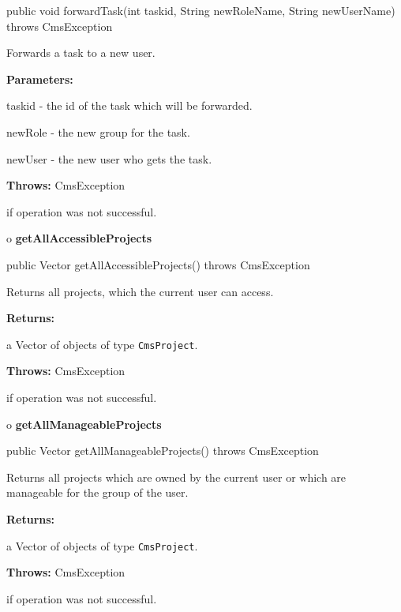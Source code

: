 \begin{PRE}
 public void forwardTask(int taskid,
                         String newRoleName,
                         String newUserName) throws CmsException
\end{PRE}

\begin{description}
\htmlDD Forwards a task to a new user.

\begin{description}
\item {\bf Parameters:}

taskid - the id of the task which will be forwarded.

newRole - the new group for the task.

newUser - the new user who gets the task.
\item {\bf Throws:} CmsException

if operation was not successful.
\end{description}

\end{description}

o {\bf getAllAccessibleProjects}

\begin{PRE}
 public Vector getAllAccessibleProjects() throws CmsException
\end{PRE}

\begin{description}
\htmlDD Returns all projects, which the current user can access.

\begin{description}
\item {\bf Returns:}

a Vector of objects of type {\tt CmsProject}.
\item {\bf Throws:} CmsException

if operation was not successful.
\end{description}

\end{description}

o {\bf getAllManageableProjects}

\begin{PRE}
 public Vector getAllManageableProjects() throws CmsException
\end{PRE}

\begin{description}
\htmlDD Returns all projects which are owned by the current user or which are
manageable for the group of the user.

\begin{description}
\item {\bf Returns:}

a Vector of objects of type {\tt CmsProject}.
\item {\bf Throws:} CmsException

if operation was not successful.
\end{description}

\end{description}


